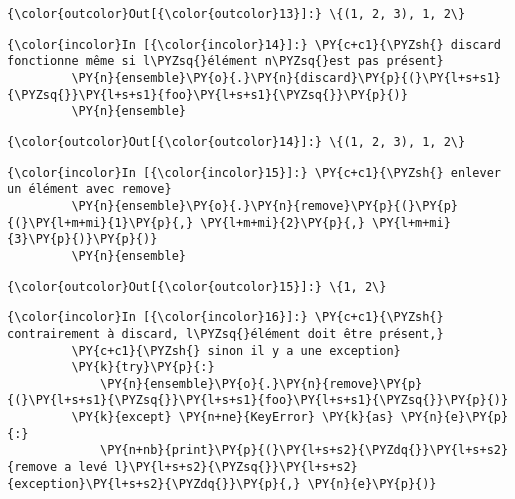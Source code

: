 \begin{Verbatim}[commandchars=\\\{\}]
{\color{outcolor}Out[{\color{outcolor}13}]:} \{(1, 2, 3), 1, 2\}
\end{Verbatim}
            
    \begin{Verbatim}[commandchars=\\\{\}]
{\color{incolor}In [{\color{incolor}14}]:} \PY{c+c1}{\PYZsh{} discard fonctionne même si l\PYZsq{}élément n\PYZsq{}est pas présent}
         \PY{n}{ensemble}\PY{o}{.}\PY{n}{discard}\PY{p}{(}\PY{l+s+s1}{\PYZsq{}}\PY{l+s+s1}{foo}\PY{l+s+s1}{\PYZsq{}}\PY{p}{)}
         \PY{n}{ensemble}
\end{Verbatim}


\begin{Verbatim}[commandchars=\\\{\}]
{\color{outcolor}Out[{\color{outcolor}14}]:} \{(1, 2, 3), 1, 2\}
\end{Verbatim}
            
    \begin{Verbatim}[commandchars=\\\{\}]
{\color{incolor}In [{\color{incolor}15}]:} \PY{c+c1}{\PYZsh{} enlever un élément avec remove}
         \PY{n}{ensemble}\PY{o}{.}\PY{n}{remove}\PY{p}{(}\PY{p}{(}\PY{l+m+mi}{1}\PY{p}{,} \PY{l+m+mi}{2}\PY{p}{,} \PY{l+m+mi}{3}\PY{p}{)}\PY{p}{)}
         \PY{n}{ensemble}
\end{Verbatim}


\begin{Verbatim}[commandchars=\\\{\}]
{\color{outcolor}Out[{\color{outcolor}15}]:} \{1, 2\}
\end{Verbatim}
            
    \begin{Verbatim}[commandchars=\\\{\}]
{\color{incolor}In [{\color{incolor}16}]:} \PY{c+c1}{\PYZsh{} contrairement à discard, l\PYZsq{}élément doit être présent,}
         \PY{c+c1}{\PYZsh{} sinon il y a une exception}
         \PY{k}{try}\PY{p}{:}
             \PY{n}{ensemble}\PY{o}{.}\PY{n}{remove}\PY{p}{(}\PY{l+s+s1}{\PYZsq{}}\PY{l+s+s1}{foo}\PY{l+s+s1}{\PYZsq{}}\PY{p}{)}
         \PY{k}{except} \PY{n+ne}{KeyError} \PY{k}{as} \PY{n}{e}\PY{p}{:}
             \PY{n+nb}{print}\PY{p}{(}\PY{l+s+s2}{\PYZdq{}}\PY{l+s+s2}{remove a levé l}\PY{l+s+s2}{\PYZsq{}}\PY{l+s+s2}{exception}\PY{l+s+s2}{\PYZdq{}}\PY{p}{,} \PY{n}{e}\PY{p}{)}
\end{Verbatim}



